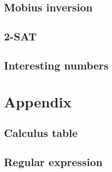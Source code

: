 \documentclass[titlepage, a4paper,10pt]{article}
\begin{document}
\begin{multicols}{2}
\begin{spacing}{0.6}
{			\subsection{Mobius inversion}
				
			\subsection{2-SAT}
				
			\subsection{Interesting numbers}
				
		\section{Appendix}
			\subsection{Calculus table}
				
				
			\subsection{Regular expression}
				
		}
		\end{spacing}
		\endgroup
	\end{multicols}
\end{document}
